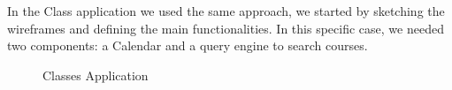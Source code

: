 \documentclass[]{usiinfbachelorproject}
\begin{document}
In the Class application we used the same approach, we started by sketching the wireframes and defining the main functionalities. In this specific case, we needed two components: a Calendar and a query engine to search courses. 
\begin{figure}[H]
  \centering
  \hfill
    \caption{Classes Application}
\end{figure}
\end{document}
